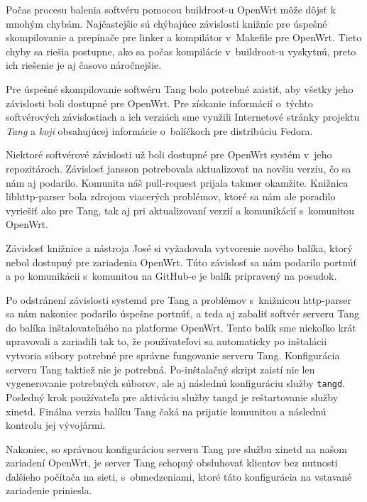 Počas procesu balenia softvéru pomocou buildroot-u OpenWrt môže dôjsť k mnohým chybám.
Najčastejšie sú chýbajúce závislosti knižníc pre úspešné skompilovanie a prepínače pre linker a kompilátor v~Makefile pre OpenWrt.
Tieto chyby sa riešia postupne, ako sa počas kompilácie v~buildroot-u vyskytnú, preto ich riešenie je aj časovo náročnejšie.

Pre úspešné skompilovanie softwéru Tang bolo potrebné zaistiť, aby všetky jeho závislosti boli dostupné pre OpenWrt.
Pre získanie informácií o~týchto softvérových závislostiach a ich verziách sme využili Internetové stránky projektu {\it Tang} a {\it koji} obsahujúcej informácie o~balíčkoch pre distribúciu Fedora.

Niektoré softvérové závislosti už boli dostupné pre OpenWrt systém v~jeho repozitároch.
Závislosť jansson potrebovala aktualizovať na novšiu verziu, čo sa nám aj podarilo.
Komunita náš pull-request prijala takmer okamžite.
Knižnica libhttp-parser bola zdrojom viacerých problémov, ktoré sa nám ale poradilo vyriešiť ako pre Tang, tak aj pri aktualizovaní verzií a komunikácií s~komunitou OpenWrt.

Závislosť knižnice a nástroja José si vyžadovala vytvorenie nového balíka, ktorý nebol dostupný pre zariadenia OpenWrt.
Túto závislosť sa nám podarilo portnúť a po komunikácii s~komunitou na GitHub-e je balík pripravený na posudok.

Po odstránení závislosti systemd pre Tang a problémov s~knižnicou http-parser sa nám nakoniec podarilo úspešne portnúť, a teda aj zabaliť softvér serveru Tang do balíka in\-šta\-lovateľného na platforme OpenWrt.
Tento balík sme niekoľko krát upravovali a zariadili tak to, že používateľovi sa automaticky po inštalácii vytvoria súbory potrebné pre správne fungovanie serveru Tang.
Konfigurácia serveru Tang taktiež nie je potrebná.
Po-inštalačný skript zaistí nie len vygenerovanie potrebných súborov, ale aj následnú konfiguráciu služby {\tt tangd}.
Posledný krok používateľa pre aktiváciu služby tangd je reštartovanie služby xinetd.
Finálna verzia balíku Tang čaká na prijatie komunitou a následnú kontrolu jej vývojármi.

Nakoniec, so správnou konfiguráciou serveru Tang pre službu xinetd na našom zariadení OpenWrt, je server Tang schopný obsluhovať klientov bez nutnosti ďalšieho počítača na sieti, s~obmedzeniami, ktoré táto konfigurácia na vstavané zariadenie priniesla.
